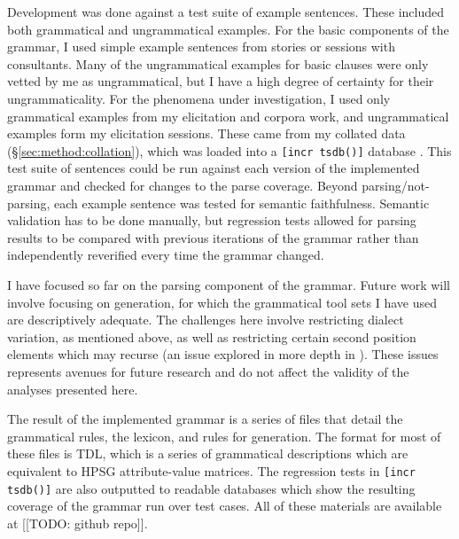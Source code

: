 Development was done against a test suite of example sentences. These included both grammatical and ungrammatical examples. For the basic components of the grammar, I used simple example sentences from stories or sessions with consultants. Many of the ungrammatical examples for basic clauses were only vetted by me as ungrammatical, but I have a high degree of certainty for their ungrammaticality. For the phenomena under investigation, I used only grammatical examples from my elicitation and corpora work, and ungrammatical examples form my elicitation sessions. These came from my collated data (\S\ref{sec:method:collation}), which was loaded into a \texttt{[incr tsdb()]} database \citep{oepen2001}. This test suite of sentences could be run against each version of the implemented grammar and checked for changes to the parse coverage. Beyond parsing/not-parsing, each example sentence was tested for semantic faithfulness. Semantic validation has to be done manually, but regression tests allowed for parsing results to be compared with previous iterations of the grammar rather than independently reverified every time the grammar changed.

I have focused so far on the parsing component of the grammar. Future work will involve focusing on generation, for which the grammatical tool sets I have used are descriptively adequate. The challenges here involve restricting dialect variation, as mentioned above, as well as restricting certain second position elements which may recurse (an issue explored in more depth in \citealt{bender2010reweaving}). These issues represents avenues for future research and do not affect the validity of the analyses presented here.


The result of the implemented grammar is a series of files that detail the grammatical rules, the lexicon, and rules for generation. The format for most of these files is TDL, which is a series of grammatical descriptions which are equivalent to HPSG attribute-value matrices. The regression tests in \texttt{[incr tsdb()]} \citep{oepen2001} are also outputted to readable databases which show the resulting coverage of the grammar run over test cases. All of these materials are available at [[TODO: github repo]].

